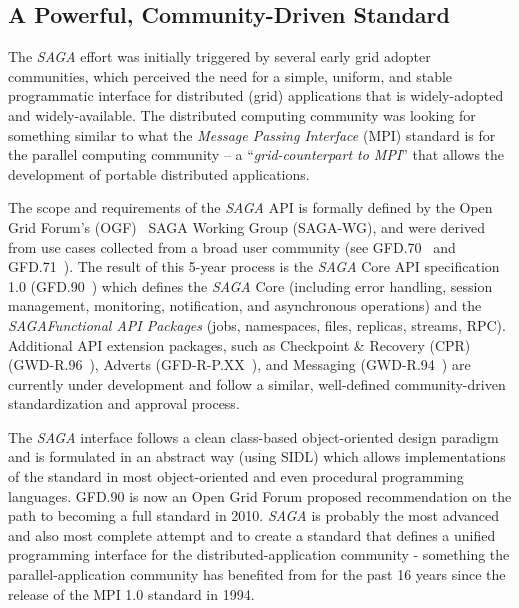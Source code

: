 \documentclass[a4paper,10pt]{article}
\newcommand{\sagaspec}{\textit{SAGA}\xspace}
\newcommand{\spec}{\sagaspec}
\begin{document}
\vspace{-0.8em}

\subsection*{A Powerful, Community-Driven Standard}
\vspace{-0.5em}

 The \spec effort was initially triggered by several early grid
 adopter communities, which perceived the need for a simple, uniform,
 and stable programmatic interface for distributed (grid) applications
 that is widely-adopted and widely-available. The distributed
 computing community was looking for something similar to what the
 \textit{Message Passing Interface} (MPI) standard is for the parallel
 computing community -- a ``\textit{grid-counterpart to MPI}'' that
 allows the development of portable distributed applications.
 
 
 The scope and requirements of the \spec API is formally defined by
 the Open Grid Forum's (OGF)~\cite{ogf} SAGA Working Group (SAGA-WG),
 and were derived from use cases collected from a broad user community
 (see GFD.70~\cite{ogf-gfd-70} and GFD.71~\cite{ogf-gfd-71}). The
 result of this 5-year process is the \spec Core API specification 1.0
 (GFD.90~\cite{ogf-gfd-90}) which defines the \spec Core (including
 error handling, session management, monitoring, notification, and
 asynchronous operations) and the \spec \textit{Functional API
 Packages} (jobs, namespaces, files, replicas, streams, RPC).
 Additional API extension packages, such as Checkpoint \& Recovery
 (CPR) (GWD-R.96~\cite{ogf-gwd-r-96}), Adverts
 (GFD-R-P.XX~\cite{ogf-gwd-r-p-xx}), and Messaging
 (GWD-R.94~\cite{ogf-gwd-r-94}) are currently under development and
 follow a similar, well-defined community-driven standardization and
 approval process. 

 
 The \spec interface follows a clean class-based object-oriented
 design paradigm and is formulated in an abstract way (using SIDL)
 which allows implementations of the standard in most object-oriented
 and even procedural programming languages. GFD.90 is now an Open Grid
 Forum proposed recommendation on the path to becoming a full standard
 in 2010. \spec is probably the most advanced and also most complete
 attempt and to create a standard that defines a unified programming
 interface for the distributed-application community - something the
 parallel-application community has benefited from for the past 16
 years since the release of the MPI 1.0 standard in 1994. 
 
\end{document}
